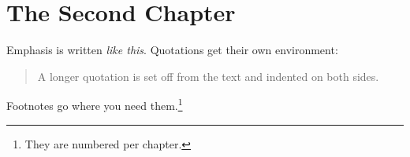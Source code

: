 \chapter{The Second Chapter}
\label{ch:second}

Emphasis is written \emph{like this}. Quotations get their own environment:

\begin{quotation}
  A longer quotation is set off from the text and indented on both sides.
\end{quotation}

Footnotes go where you need them.\footnote{They are numbered per chapter.}
